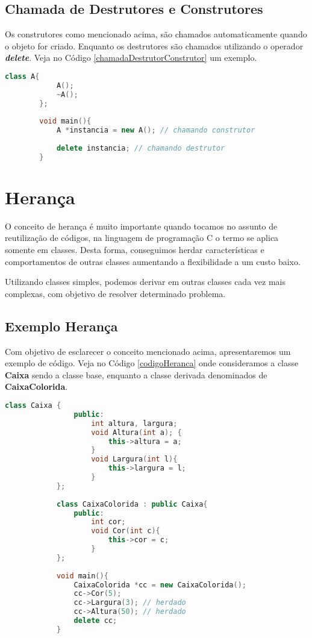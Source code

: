 \documentclass[a4paper, 12pt]{article}
\def\Cplusplus{C\raisebox{0.5ex}{\tiny\textbf{++}} }
\begin{document}
	\subsection{Chamada de Destrutores e Construtores}
	
	Os construtores como mencionado acima, são chamados automaticamente quando o objeto for criado. Enquanto os destrutores são chamados utilizando o operador \textbf{\textit{delete}}. Veja no Código \ref{chamadaDestrutorConstrutor} um exemplo.
	
	\vspace{0.2cm}
	\begin{lstlisting}[language=C++, style=mystyle, caption={Chamada de construtor e destrutor.}, label=chamadaDestrutorConstrutor, extendedchars=true]		
		class A{
			A();
			~A();
		};
	
		void main(){
			A *instancia = new A(); // chamando construtor
			
			delete instancia; // chamando destrutor
		}
	\end{lstlisting}
	
	
	\section{Herança}
		
		O conceito de herança é muito importante quando tocamos no assunto de reutilização de códigos, na linguagem de programação \Cplusplus  o termo se aplica somente em classes. Desta forma, conseguimos herdar características e comportamentos de outras classes aumentando a flexibilidade a um custo baixo.
		
		Utilizando classes simples, podemos derivar em outras classes cada vez mais complexas, com objetivo de resolver determinado problema.
		
		\subsection{Exemplo Herança}
		
		Com objetivo de esclarecer o conceito mencionado acima, apresentaremos um exemplo de código. Veja no Código \ref{codigoHeranca} onde consideramos a classe \textbf{Caixa} sendo a classe base, enquanto a classe derivada denominados de \textbf{CaixaColorida}.
		
		\vspace{0.1cm}
		\begin{lstlisting}[language=C++, style=mystyle, caption={Exemplo de herança.}, label=codigoHeranca, extendedchars=true]		
			class Caixa {
				public:
					int altura, largura;
					void Altura(int a); {
						this->altura = a; 
					}
					void Largura(int l){
						this->largura = l;
					}
			};
		
			class CaixaColorida : public Caixa{
				public:
					int cor;
					void Cor(int c){
						this->cor = c;
					}
			};
		
			void main(){
				CaixaColorida *cc = new CaixaColorida();
				cc->Cor(5);
				cc->Largura(3); // herdado
				cc->Altura(50); // herdado
				delete cc;
			}
		\end{lstlisting}
		
\end{document}
